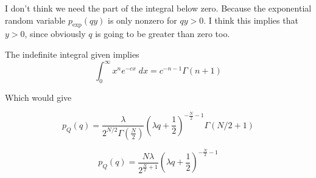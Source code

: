 \documentclass{article}
\begin{document}
I don't think we need the part of the integral below zero. Because the exponential random variable $p_\text{exp}(qy)$ is only nonzero for $qy > 0$. I think this implies that $y>0$, since obviously $q$ is going to be greater than zero too.

The indefinite integral given implies
$$
\int_{0}^{\infty} x^n e^{-cx} \; dx = c^{-n-1} \Gamma(n+1)
$$

Which would give

$$
p_Q(q) = \frac{\lambda}{2^{N/2} \Gamma(\frac{N}{2})} \left(\lambda q + \frac{1}{2}\right)^{-\frac{N}{2} - 1} \Gamma(N/2+1)
$$

$$
p_Q(q) = \frac{N\lambda}{2^{\frac{N}{2} + 1}} \left(\lambda q + \frac{1}{2}\right)^{-\frac{N}{2} - 1} 
$$
\end{document}
